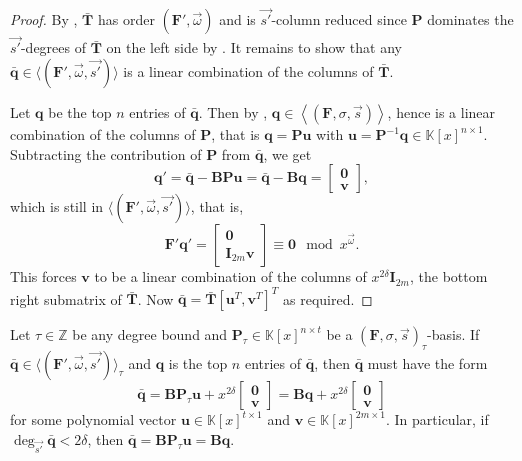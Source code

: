 \begin{proof}
By , $\bar{\mathbf{T}}$ has order $(\mathbf{F}',\vec{\omega})$
and is $\vec{s'}$-column reduced since $\mathbf{P}$ dominates the
$\vec{s'}$-degrees of $\bar{\mathbf{T}}$ on the left side by .
It remains to show that any $\bar{\mathbf{q}}\in\langle(\mathbf{F}',\vec{\omega},\vec{s'})\rangle$
is a linear combination of the columns of $\mathbf{\bar{\mathbf{T}}}$.

Let $\mathbf{q}$ be the top $n$ entries of $\bar{\mathbf{q}}$.
Then by , $\mathbf{q}\in\left\langle \left(\mathbf{F},\sigma,\vec{s}\right)\right\rangle $,
hence is a linear combination of the columns of $\mathbf{P}$, that
is $\mathbf{q}=\mathbf{P}\mathbf{u}$ with $\mathbf{u}=\mathbf{P}^{-1}\mathbf{q}\in\mathbb{K}\left[x\right]^{n\times1}$.
Subtracting the contribution of $\mathbf{P}$ from $\bar{\mathbf{q}}$,
we get 
\[
\mathbf{q}'=\bar{\mathbf{q}}-\mathbf{B}\mathbf{P}\mathbf{u}=\bar{\mathbf{q}}-\mathbf{B}\mathbf{q}=\left[\begin{array}{c}
\mathbf{0}\\
\mathbf{v}
\end{array}\right],
\]
 which is still in $\langle(\mathbf{F}',\vec{\omega},\vec{s'})\rangle$,
that is, 
\[
\mathbf{F}'\mathbf{q}'=\begin{bmatrix}\mathbf{0}\\
\mathbf{I}_{2m}\mathbf{v}
\end{bmatrix}\equiv\mathbf{0}\mod x^{\vec{\omega}}.
\]
 This forces $\mathbf{v}$ to be a linear combination of the columns
of $x^{2\delta}\mathbf{I}_{2m}$, the bottom right submatrix of $\bar{\mathbf{T}}$.
Now $\bar{\mathbf{q}}=\bar{\mathbf{T}}\left[\mathbf{u}^{T},\mathbf{v}^{T}\right]^{T}$
as required.\end{proof}
\begin{cor}
\label{cor:FtauBasisForm}Let $\tau\in\mathbb{Z}$ be any degree bound
and $\mathbf{P}_{\tau}\in\mathbb{K}\left[x\right]^{n\times t}$ be
a $\left(\mathbf{F},\sigma,\vec{s}\right)_{\tau}$-basis. If $\bar{\mathbf{q}}\in\langle(\mathbf{F}',\vec{\omega},\vec{s'})\rangle_{\tau}$
and $\mathbf{q}$ is the top $n$ entries of $\bar{\mathbf{q}}$,
then $\bar{\mathbf{q}}$ must have the form 
\[
\bar{\mathbf{q}}=\mathbf{B}\mathbf{P}_{\tau}\mathbf{u}+x^{2\delta}\begin{bmatrix}\mathbf{0}\\
\mathbf{v}
\end{bmatrix}=\mathbf{B}\mathbf{q}+x^{2\delta}\begin{bmatrix}\mathbf{0}\\
\mathbf{v}
\end{bmatrix}
\]
 for some polynomial vector $\mathbf{u}\in\mathbb{K}\left[x\right]^{t\times1}$
and $\mathbf{v}\in\mathbb{K}\left[x\right]^{2m\times1}$. In particular,
if $\deg_{\vec{s'}}\bar{\mathbf{q}}<2\delta$, then $\bar{\mathbf{q}}=\mathbf{B}\mathbf{P}_{\tau}\mathbf{u}=\mathbf{B}\mathbf{q}$. \end{cor}
